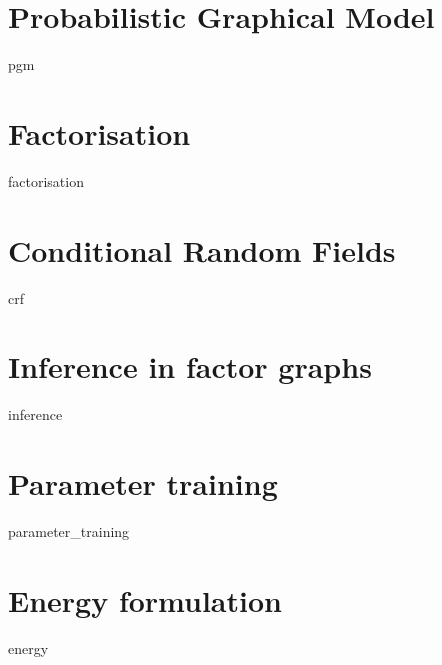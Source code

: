 \documentclass[12pt]{report}
\begin{document}
\section{Probabilistic Graphical Model}
{pgm}

\section{Factorisation}
{factorisation}

\section{Conditional Random Fields }
{crf}
	
\section{Inference in factor graphs}
\label{sec:inference}
{inference}

\section{Parameter training }
{parameter_training}

\section{Energy formulation}	
\label{sec:energy}
{energy}
\newpage
\printbibliography 
\end{document}
